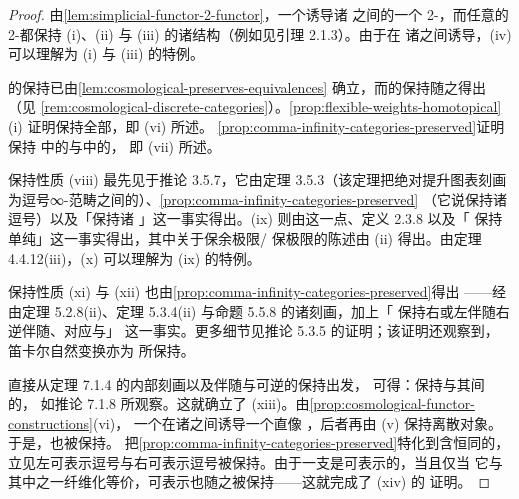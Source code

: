 \begin{proof}
由\cref{lem:simplicial-functor-2-functor}，一个\trCosmologicalFunctor{}诱导诸%
\trHomotopyTwoCategory{}之间的一个 2-\trFunctor，而任意的 2-\trFunctor{}都保持
(i)、(ii) 与 (iii) 的诸结构（例如见引理 2.1.3）。由于\trCosmologicalFunctor{}在
诸\trSliceInfinityCosmos{}之间诱导\trCosmologicalFunctor，(iv) 可以理解为
(i) 与 (iii) 的特例。

\trTrivialFibration{}的保持已由\cref{lem:cosmological-preserves-equivalences}
确立，而\trDiscrete{}\trInfinityCategory{}的保持随之得出（见%
\cref{rem:cosmological-discrete-categories}）。\cref{prop:flexible-weights-homotopical}(i)
证明\trCosmologicalFunctor{}保持全部\trFlexibleWeightedLimit，即 (vi) 所述。
\cref{prop:comma-infinity-categories-preserved}证明\trCosmologicalFunctor{}保持%
\trInfinityCosmos{}中的\trCommaSpan{}与\trHomotopyTwoCategory{}中的\trCommaCone，
即 (vii) 所述。

保持性质 (viii) 最先见于推论 3.5.7，它由定理 3.5.3（该定理把绝对提升图表刻画
为逗号∞-范畴之间的\trFiberedEquivalence）、\cref{prop:comma-infinity-categories-preserved}
（它说\trCosmologicalFunctor{}保持诸逗号）以及「\trCosmologicalFunctor{}保持诸%
\trEquivalence」这一事实得出。(ix) 则由这一点、定义 2.3.8 以及「%
\trCosmologicalFunctor{}保持单纯\trTensor」这一事实得出，其中关于保余极限/
保极限\trFunctor{}的陈述由 (ii) 得出。由定理 4.4.12(iii)，(x) 可以理解为
(ix) 的特例。

保持性质 (xi) 与 (xii) 也由\cref{prop:comma-infinity-categories-preserved}得出
——经由定理 5.2.8(ii)、定理 5.3.4(ii) 与命题 5.5.8 的诸刻画，加上「%
\trCosmologicalFunctor{}保持右或左伴随右逆伴随、对应与\trTrivialFibration」
这一事实。更多细节见推论 5.3.5 的证明；该证明还观察到，笛卡尔自然变换亦为%
\trCosmologicalFunctor{}所保持。

直接从定理 7.1.4 的内部刻画以及伴随与可逆\trNaturalTransformation{}的保持出发，
可得：\trCartesianFunctor{}保持\trTwoSidedFibration{}与其间的\trCartesianFunctor，
如推论 7.1.8 所观察。这就确立了 (xiii)。由\cref{prop:cosmological-functor-constructions}(vi)，
一个\trCosmologicalFunctor{}在诸\trSliceInfinityCosmos{}之间诱导一个直像%
\trCosmologicalFunctor，后者再由 (v) 保持离散对象。于是，\trModule{}也被保持。
把\cref{prop:comma-infinity-categories-preserved}特化到含恒同的\trCospan，
立见左可表示逗号与右可表示逗号被保持。由于一支\trModule{}是可表示的，当且仅当
它与其中之一纤维化等价，可表示\trModule{}也随之被保持——这就完成了 (xiv) 的
证明。
\end{proof}


